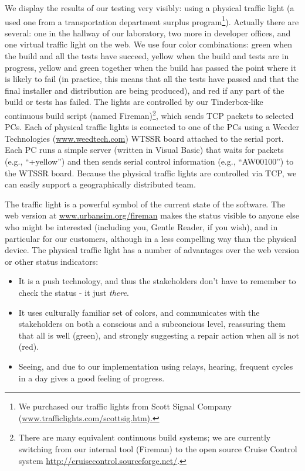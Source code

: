 \documentclass[times, 10pt,twocolumn]{article}
\newcommand{\tight}{\itemsep 0pt}
\begin{document}
We display the results of our testing very visibly: using a physical
traffic light (a used one from a transportation department surplus
program\footnote{We purchased our traffic lights from Scott Signal
Company (\url{www.trafficlights.com/scottsig.htm).}}).  
Actually there are
several: one in the hallway of our laboratory, two more in developer
offices, and one virtual traffic light on the web.  We use four color
combinations: green when the build and all the tests have succeed, yellow
when the build and tests are in progress, yellow and green together when
the build has passed the point where it is likely to fail (in practice,
this means that all the tests have passed and that the final installer and
distribution are being produced), and red if any part of the build or tests
has failed.  The lights are controlled by our Tinderbox-like continuous
build script (named Fireman)\footnote{There are many equivalent
continuous build
systems; we are currently switching from our internal tool (Fireman) 
to the open source
Cruise Control system \url{http://cruisecontrol.sourceforge.net/}.}, 
which sends TCP packets to selected PCs. Each
of physical traffic lights is connected to one of the PCs using a Weeder
Technologies (\url{www.weedtech.com}) WTSSR board attached 
to the serial
port. Each PC runs a simple server (written in Visual Basic) that waits for
packets (e.g., ``+yellow'') and then sends serial control information
(e.g., ``AW00100'') to the WTSSR board.  Because the physical traffic
lights are controlled via TCP, we can easily support a geographically
distributed team.

The traffic light is a powerful symbol of the current state of the software.
The web version at \url{www.urbansim.org/fireman} makes the status visible to
anyone else who might be interested (including you, Gentle Reader, if you
wish), and in particular for our customers, although in a less compelling
way than the physical device.  The physical traffic light has a number of
advantages over the web version or other status indicators: 
\begin{itemize}
\tight
\item It is a push technology, and thus the stakeholders don't have to 
remember to check the status - it just \emph{there}.
\item It uses culturally familiar set of colors, and communicates with the
stakeholders on both 
a conscious and a subconcious level, reassuring them that all is well (green),
and strongly suggesting a repair action when all is not (red).

\pagebreak

\item Seeing, and due to our implementation using relays, hearing, frequent
cycles in a day gives a good feeling of progress.
\end{itemize}
\end{document}
